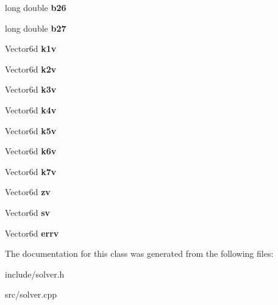\begin{DoxyCompactItemize}
\item 
long double {\bfseries b26}\label{class_numerical_solver_a353b1e5d87fff5b4a21dcb99fcaff04d}

\item 
long double {\bfseries b27}\label{class_numerical_solver_a9e239affbdac0b6072d6b44243b708d4}

\item 
Vector6d {\bfseries k1v}\label{class_numerical_solver_a93ef81dfb4ef831a5450bf8fa837a9a7}

\item 
Vector6d {\bfseries k2v}\label{class_numerical_solver_acc393c1ef473672544099ad982899440}

\item 
Vector6d {\bfseries k3v}\label{class_numerical_solver_a9d591f1d328805ec3126cb1c06b9cf24}

\item 
Vector6d {\bfseries k4v}\label{class_numerical_solver_a5008982363bc64e6470d3f2b21f2fe5e}

\item 
Vector6d {\bfseries k5v}\label{class_numerical_solver_a20b7c5b49cf40832eebc0758e9dda731}

\item 
Vector6d {\bfseries k6v}\label{class_numerical_solver_a1472bad71e92d0c36e181784841af4dd}

\item 
Vector6d {\bfseries k7v}\label{class_numerical_solver_a346e784e7ed2a87f86d7d9742ad9e28a}

\item 
Vector6d {\bfseries zv}\label{class_numerical_solver_a91c473d6e9a890cfaff1ffd8252d6647}

\item 
Vector6d {\bfseries sv}\label{class_numerical_solver_a77191b6497e19b1c979faf7ae6577408}

\item 
Vector6d {\bfseries errv}\label{class_numerical_solver_a1e67e7d370ffcbda9f00f62b67f2b222}

\end{DoxyCompactItemize}


The documentation for this class was generated from the following files\+:\begin{DoxyCompactItemize}
\item 
include/solver.\+h\item 
src/solver.\+cpp\end{DoxyCompactItemize}
